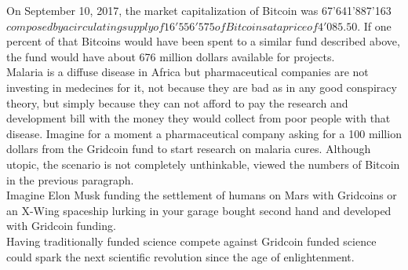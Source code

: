 On September 10, 2017, the market capitalization of Bitcoin was 67'641'887'163 $ composed by a circulating supply of 16'556'575 of Bitcoins at a price of 4'085.50 $. If one percent of that Bitcoins would have been spent to a similar fund described above, the fund would have about 676 million dollars available for projects.\\

Malaria is a diffuse disease in Africa but pharmaceutical companies are not investing in medecines for it, not because they are bad as in any good conspiracy theory, but simply because they can not afford to pay the research and development bill with the money they would collect from poor people with that disease. Imagine for a moment a pharmaceutical company asking for a 100 million dollars from the Gridcoin fund to start research on malaria cures. Although utopic, the scenario is not completely unthinkable, viewed the numbers of Bitcoin in the previous paragraph.\\

Imagine Elon Musk funding the settlement of humans on Mars with Gridcoins or an X-Wing spaceship lurking in your garage bought second hand and developed with Gridcoin funding.\\

Having traditionally funded science compete against Gridcoin funded science could spark the next scientific revolution since the age of enlightenment.\\
